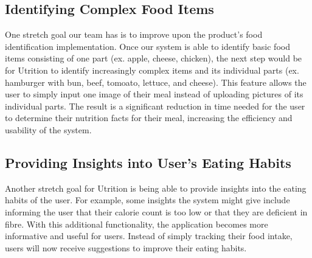 \documentclass{article}
\begin{document}
\subsection{Identifying Complex Food Items}

One stretch goal our team has is to improve upon the product's food identification implementation. Once our system is able to identify basic food items consisting of one part (ex. apple, cheese, chicken), the next step would be for Utrition to identify increasingly complex items and its individual parts (ex. hamburger with bun, beef, tomoato, lettuce, and cheese). This feature allows the user to simply input one image of their meal instead of uploading pictures of its individual parts. The result is a significant reduction in time needed for the user to determine their nutrition facts for their meal, increasing the efficiency and usability of the system.

\subsection{Providing Insights into User's Eating Habits}

Another stretch goal for Utrition is being able to provide insights into the eating habits of the user. For example, some insights the system might give include informing the user that their calorie count is too low or that they are deficient in fibre. With this additional functionality, the application becomes more informative and useful for users. Instead of simply tracking their food intake, users will now receive suggestions to improve their eating habits.
\end{document}
